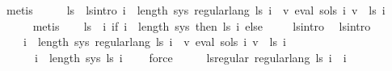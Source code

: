 \begin{isabellebody}
\ metis\isanewline
\ \ \isamarkupfalse%
\ \isamarkupfalse%
\ ls\ \ ls{\isacharunderscore}{\kern0pt}intro{\isacharcolon}{\kern0pt}\ {\isachardoublequoteopen}{\isasymforall}i\ {\isacharless}{\kern0pt}\ length\ sys{\isachardot}{\kern0pt}\ regular{\isacharunderscore}{\kern0pt}lang\ {\isacharparenleft}{\kern0pt}ls\ i{\isacharparenright}{\kern0pt}\ {\isasymand}\ {\isacharparenleft}{\kern0pt}{\isasymforall}v{\isachardot}{\kern0pt}\ eval\ {\isacharparenleft}{\kern0pt}sols\ i{\isacharparenright}{\kern0pt}\ v\ {\isacharequal}{\kern0pt}\ ls\ i{\isacharparenright}{\kern0pt}{\isachardoublequoteclose}\isanewline
\ \ \ \ \isamarkupfalse%
\ metis\isanewline
\isanewline
\ \ \isamarkupfalse%
\ {\isacharquery}{\kern0pt}ls{\isacharprime}{\kern0pt}\ {\isacharequal}{\kern0pt}\ {\isachardoublequoteopen}{\isasymlambda}i{\isachardot}{\kern0pt}\ if\ i\ {\isacharless}{\kern0pt}\ length\ sys\ then\ ls\ i\ else\ {\isacharbraceleft}{\kern0pt}{\isacharbraceright}{\kern0pt}{\isachardoublequoteclose}\isanewline
\ \ \isamarkupfalse%
\ ls{\isacharunderscore}{\kern0pt}intro\ \isamarkupfalse%
\ ls{\isacharprime}{\kern0pt}{\isacharunderscore}{\kern0pt}intro{\isacharcolon}{\kern0pt}\isanewline
\ \ \ \ {\isachardoublequoteopen}{\isacharparenleft}{\kern0pt}{\isasymforall}i\ {\isacharless}{\kern0pt}\ length\ sys{\isachardot}{\kern0pt}\ regular{\isacharunderscore}{\kern0pt}lang\ {\isacharparenleft}{\kern0pt}{\isacharquery}{\kern0pt}ls{\isacharprime}{\kern0pt}\ i{\isacharparenright}{\kern0pt}\ {\isasymand}\ {\isacharparenleft}{\kern0pt}{\isasymforall}v{\isachardot}{\kern0pt}\ eval\ {\isacharparenleft}{\kern0pt}sols\ i{\isacharparenright}{\kern0pt}\ v\ {\isacharequal}{\kern0pt}\ {\isacharquery}{\kern0pt}ls{\isacharprime}{\kern0pt}\ i{\isacharparenright}{\kern0pt}{\isacharparenright}{\kern0pt}\isanewline
\ \ \ \ \ {\isasymand}\ {\isacharparenleft}{\kern0pt}{\isasymforall}i\ {\isasymge}\ length\ sys{\isachardot}{\kern0pt}\ {\isacharquery}{\kern0pt}ls{\isacharprime}{\kern0pt}\ i\ {\isacharequal}{\kern0pt}\ {\isacharbraceleft}{\kern0pt}{\isacharbraceright}{\kern0pt}{\isacharparenright}{\kern0pt}{\isachardoublequoteclose}\ \isamarkupfalse%
\ force\isanewline
\ \ \isamarkupfalse%
\ \isamarkupfalse%
\ ls{\isacharprime}{\kern0pt}{\isacharunderscore}{\kern0pt}regular{\isacharcolon}{\kern0pt}\ {\isachardoublequoteopen}regular{\isacharunderscore}{\kern0pt}lang\ {\isacharparenleft}{\kern0pt}{\isacharquery}{\kern0pt}ls{\isacharprime}{\kern0pt}\ i{\isacharparenright}{\kern0pt}{\isachardoublequoteclose}\ \ i\ \isamarkupfalse%

\end{isabellebody}
